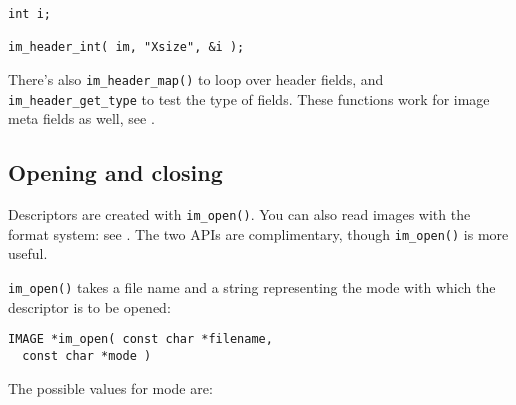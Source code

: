 \begin{verbatim}
int i;

im_header_int( im, "Xsize", &i );
\end{verbatim}

There's also \verb+im_header_map()+ to loop over header fields, and
\verb+im_header_get_type+ to test the type of fields. These functions work for
image meta fields as well, see .

\subsection{Opening and closing}
\label{sec:open}

Descriptors are created with \verb+im_open()+. You can also read images with
the format system: see . The two APIs are complimentary,
though \verb+im_open()+ is more useful.

\verb+im_open()+ takes a file name and a string representing the mode with
which the descriptor is to be opened:

\begin{verbatim}
IMAGE *im_open( const char *filename, 
  const char *mode )
\end{verbatim}

The possible values for mode are:
  
